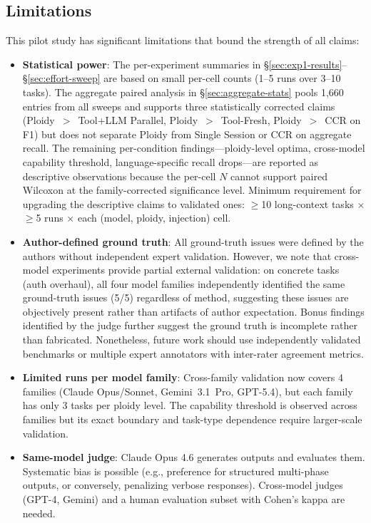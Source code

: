 \documentclass[11pt]{article}
\begin{document}
\subsection{Limitations}
\label{sec:limitations}

This pilot study has significant limitations that bound the strength of all claims:

\begin{itemize}[leftmargin=1.5em]
  \item \textbf{Statistical power}: The per-experiment summaries in \S\ref{sec:exp1-results}--\S\ref{sec:effort-sweep} are based on small per-cell counts (1--5 runs over 3--10 tasks). The aggregate paired analysis in \S\ref{sec:aggregate-stats} pools 1{,}660 entries from all sweeps and supports three statistically corrected claims (Ploidy~$>$~Tool+LLM Parallel, Ploidy~$>$~Tool-Fresh, Ploidy~$>$~CCR on F1) but does not separate Ploidy from Single Session or CCR on aggregate recall. The remaining per-condition findings---ploidy-level optima, cross-model capability threshold, language-specific recall drops---are reported as descriptive observations because the per-cell $N$ cannot support paired Wilcoxon at the family-corrected significance level. Minimum requirement for upgrading the descriptive claims to validated ones: $\geq$10 long-context tasks $\times$ $\geq$5 runs $\times$ each (model, ploidy, injection) cell.
  \item \textbf{Author-defined ground truth}: All ground-truth issues were defined by the authors without independent expert validation. However, we note that cross-model experiments provide partial external validation: on concrete tasks (auth overhaul), all four model families independently identified the same ground-truth issues (5/5) regardless of method, suggesting these issues are objectively present rather than artifacts of author expectation. Bonus findings identified by the judge further suggest the ground truth is incomplete rather than fabricated. Nonetheless, future work should use independently validated benchmarks or multiple expert annotators with inter-rater agreement metrics.
  \item \textbf{Limited runs per model family}: Cross-family validation now covers 4 families (Claude Opus/Sonnet, Gemini~3.1~Pro, GPT-5.4), but each family has only 3 tasks per ploidy level. The capability threshold is observed across families but its exact boundary and task-type dependence require larger-scale validation.
  \item \textbf{Same-model judge}: Claude Opus 4.6 generates outputs and evaluates them. Systematic bias is possible (e.g., preference for structured multi-phase outputs, or conversely, penalizing verbose responses). Cross-model judges (GPT-4, Gemini) and a human evaluation subset with Cohen's kappa are needed.

\end{itemize}
\end{document}
